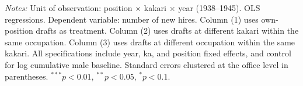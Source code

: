 \begin{table}[htbp]
\begin{threeparttable}
\begin{tablenotes}[flushleft]
\footnotesize
\item \textit{Notes:} Unit of observation: position $\times$ kakari $\times$ year (1938--1945). OLS regressions. Dependent variable: number of new hires. Column (1) uses own-position drafts as treatment. Column (2) uses drafts at different kakari within the same occupation. Column (3) uses drafts at different occupation within the same kakari. All specifications include year, ka, and position fixed effects, and control for log cumulative male baseline. Standard errors clustered at the office level in parentheses. $^{***}p<0.01$, $^{**}p<0.05$, $^{*}p<0.1$.
\end{tablenotes}
\end{threeparttable}
\end{table}
